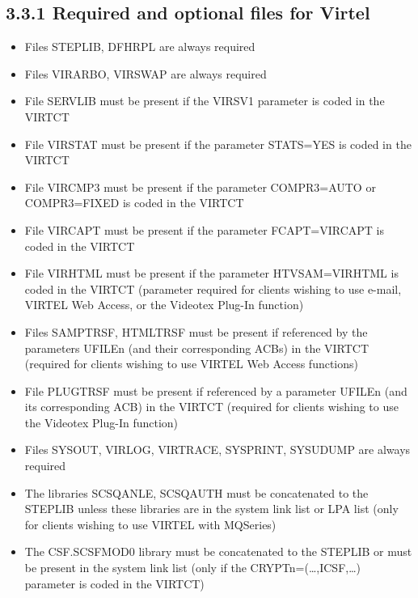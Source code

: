 \documentclass[letterpaper,10pt,english]{sphinxmanual}
\begin{document}
\subsection{3.3.1 Required and optional files for Virtel}
\label{\detokenize{Installation_Guide:required-and-optional-files-for-virtel}}\begin{itemize}
\item {} 
Files STEPLIB, DFHRPL are always required

\item {} 
Files VIRARBO, VIRSWAP are always required

\item {} 
File SERVLIB must be present if the VIRSV1 parameter is coded in the VIRTCT

\item {} 
File VIRSTAT must be present if the parameter STATS=YES is coded in the VIRTCT

\item {} 
File VIRCMP3 must be present if the parameter COMPR3=AUTO or COMPR3=FIXED is coded in the VIRTCT

\item {} 
File VIRCAPT must be present if the parameter FCAPT=VIRCAPT is coded in the VIRTCT

\item {} 
File VIRHTML must be present if the parameter HTVSAM=VIRHTML is coded in the VIRTCT (parameter required for clients wishing to use e-mail, VIRTEL Web Access, or the Videotex Plug-In function)

\item {} 
Files SAMPTRSF, HTMLTRSF must be present if referenced by the parameters UFILEn (and their corresponding ACBs) in the VIRTCT (required for clients wishing to use VIRTEL Web Access functions)

\item {} 
File PLUGTRSF must be present if referenced by a parameter UFILEn (and its corresponding ACB) in the VIRTCT (required for clients wishing to use the Videotex Plug-In function)

\item {} 
Files SYSOUT, VIRLOG, VIRTRACE, SYSPRINT, SYSUDUMP are always required

\item {} 
The libraries SCSQANLE, SCSQAUTH must be concatenated to the STEPLIB unless these libraries are in the system link list or LPA list (only for clients wishing to use VIRTEL with MQSeries)

\item {} 
The CSF.SCSFMOD0 library must be concatenated to the STEPLIB or must be present in the system link list (only if the CRYPTn=(…,ICSF,…) parameter is coded in the VIRTCT)

\end{itemize}
\end{document}
